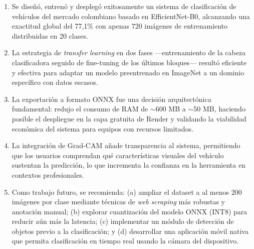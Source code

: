 \documentclass[12pt,a4paper]{article}
\begin{document}
\begin{enumerate}
    \item Se diseñó, entrenó y desplegó exitosamente un sistema de clasificación de vehículos del mercado colombiano basado en EfficientNet-B0, alcanzando una exactitud global del 77,1\% con apenas 720 imágenes de entrenamiento distribuidas en 20 clases.

    \item La estrategia de \textit{transfer learning} en dos fases —entrenamiento de la cabeza clasificadora seguido de fine-tuning de los últimos bloques— resultó eficiente y efectiva para adaptar un modelo preentrenado en ImageNet a un dominio específico con datos escasos.

    \item La exportación a formato ONNX fue una decisión arquitectónica fundamental: redujo el consumo de RAM de $\sim$600 MB a $\sim$50 MB, haciendo posible el despliegue en la capa gratuita de Render y validando la viabilidad económica del sistema para equipos con recursos limitados.

    \item La integración de Grad-CAM añade transparencia al sistema, permitiendo que los usuarios comprendan qué características visuales del vehículo sustentan la predicción, lo que incrementa la confianza en la herramienta en contextos profesionales.

    \item Como trabajo futuro, se recomienda: (a) ampliar el dataset a al menos 200 imágenes por clase mediante técnicas de \textit{web scraping} más robustas y anotación manual; (b) explorar cuantización del modelo ONNX (INT8) para reducir aún más la latencia; (c) implementar un módulo de detección de objetos previo a la clasificación; y (d) desarrollar una aplicación móvil nativa que permita clasificación en tiempo real usando la cámara del dispositivo.
\end{enumerate}
\end{document}
